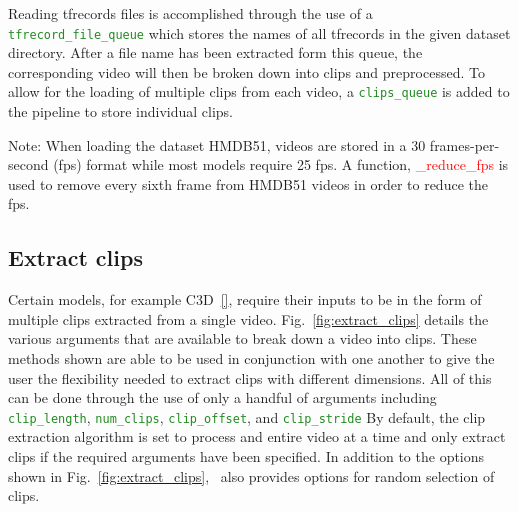 \documentclass{llncs}
\begin{document}
Reading tfrecords files is accomplished through the use of a \texttt{\textcolor{ForestGreen}{tfrecord\_file\_queue}} which stores the names of all tfrecords in the given dataset directory.
After a file name has been extracted form this queue, the corresponding video will then be broken down into clips and preprocessed.
To allow for the loading of multiple clips from each video, a \texttt{\textcolor{ForestGreen}{clips\_queue}} is added to the pipeline to store individual clips.

Note: When loading the dataset HMDB51, videos are stored in a 30 frames-per-second (fps) format while most models require 25 fps. A function, \textcolor{red}{\_reduce\_fps} is used to remove every sixth frame from HMDB51 videos in order to reduce the fps.


\subsection{Extract clips}
\label{sec:extractclips}
Certain models, for example C3D~\ref{}, require their inputs to be in the form of multiple clips extracted from a single video.
Fig.~\ref{fig:extract_clips} details the various arguments that are available to break down a video into clips.
These methods shown are able to be used in conjunction with one another to give the user the flexibility needed to extract clips with different dimensions.
All of this can be done through the use of only a handful of arguments including \texttt{\textcolor{ForestGreen}{clip\_length}}, \texttt{\textcolor{ForestGreen}{num\_clips}}, \texttt{\textcolor{ForestGreen}{clip\_offset}}, and \texttt{\textcolor{ForestGreen}{clip\_stride}}
By default, the clip extraction algorithm is set to process and entire video at a time and only extract clips if the required arguments have been specified.
In addition to the options shown in Fig.~\ref{fig:extract_clips}, \acro~also provides options for random selection of clips.
\end{document}
